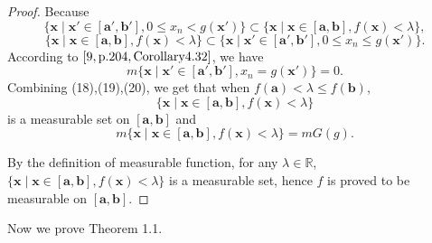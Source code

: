 \documentclass{ijclclp}
\begin{document}
\begin{proof}
    Because
    \begin{equation}
        \{\boldsymbol{x}\mid \boldsymbol{x}'\in[\boldsymbol{a}',\boldsymbol{b}'],0\leq x_n< g(\boldsymbol{x}')\}\subset\{\boldsymbol{x}\mid \boldsymbol{x}\in[\boldsymbol{a},\boldsymbol{b}],f(\boldsymbol{x})<\lambda\},
    \end{equation}
    \begin{equation}
        \{\boldsymbol{x}\mid \boldsymbol{x}\in[\boldsymbol{a},\boldsymbol{b}],f(\boldsymbol{x})<\lambda\}\subset\{\boldsymbol{x}\mid \boldsymbol{x}'\in[\boldsymbol{a}',\boldsymbol{b}'],0\leq x_n\leq g(\boldsymbol{x}')\}.
    \end{equation}
    According to \([9,\rm{p}.204,Corollary4.32]\), we have
    \begin{equation}
        m\{\boldsymbol{x}\mid \boldsymbol{x}'\in[\boldsymbol{a}',\boldsymbol{b}'],x_n=g(\boldsymbol{x}')\}=0.
    \end{equation}
    Combining (18),(19),(20), we get that when \(f(\boldsymbol{a})< \lambda\leq f(\boldsymbol{b})\),
    \[\{\boldsymbol{x}\mid \boldsymbol{x}\in[\boldsymbol{a},\boldsymbol{b}],f(\boldsymbol{x})<\lambda\}\]
    is a measurable set on \([\boldsymbol{a},\boldsymbol{b}]\) and
    \[m\{\boldsymbol{x}\mid \boldsymbol{x}\in[\boldsymbol{a},\boldsymbol{b}],f(\boldsymbol{x})<\lambda\}=mG(g).\]

    By the definition of measurable function, for any \(\lambda\in\mathbb{R}\), \(\{\boldsymbol{x}\mid \boldsymbol{x}\in[\boldsymbol{a},\boldsymbol{b}],f(\boldsymbol{x})<\lambda\}\) is a measurable set, hence \(f\) is proved to be measurable on \([\boldsymbol{a},\boldsymbol{b}]\). 
\end{proof}
Now we prove Theorem 1.1.\\[-0.5em]
    
\end{document}
